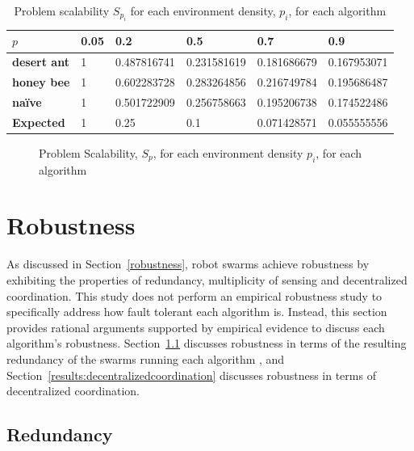 \begin{table}[]
\centering
\caption{Problem scalability $S_{p_i}$ for each environment density, $p_i$, for each algorithm}
\label{table:problemscalability}
\begin{tabular}{@{}llllll@{}}
\toprule
\textbf{$p$}                  & \textbf{0.05} & \textbf{0.2        } & \textbf{0.5}         & \textbf{0.7}         & \textbf{0.9}         \\ \midrule
\textbf{desert ant}           & 1    & 0.487816741 & 0.231581619 & 0.181686679 & 0.167953071 \\
\textbf{honey bee}            & 1    & 0.602283728 & 0.283264856 & 0.216749784 & 0.195686487 \\
\textbf{na\"ive}              & 1    & 0.501722909 & 0.256758663 & 0.195206738 & 0.174522486 \\
\textbf{Expected} & 1    & 0.25        & 0.1         & 0.071428571 & 0.055555556 \\ \bottomrule
\end{tabular}
\end{table}

\begin{figure}[!htb]
\centering
\resizebox{\textwidth}{!}{}
\caption{Problem Scalability, $S_p$, for each environment density $p_i$, for each algorithm}
\label{fig:problemscalability}
\end{figure}

\section{Robustness}
\label{results:robustness}
As discussed in Section~\ref{robustness}, robot swarms achieve robustness by exhibiting the properties of redundancy, multiplicity of sensing and decentralized coordination. This study does not perform an empirical robustness study to specifically address how fault tolerant each algorithm is. Instead, this section provides rational arguments supported by empirical evidence to discuss each algorithm's robustness. Section~\ref{results:redundancy} discusses robustness in terms of the resulting redundancy of the swarms running each algorithm , and Section~\ref{results:decentralizedcoordination} discusses robustness in terms of decentralized coordination.

\subsection{Redundancy}
\label{results:redundancy}

